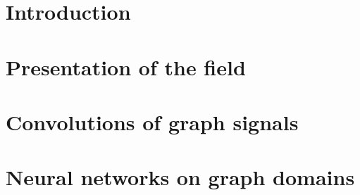 \documentclass[12pt]{book}
\begin{document}

%
%




\newline



 \dominitoc
 \tableofcontents
 \adjustmtc


%
%

\chapter*{Introduction}\label{chp:int}

\todo{}

%
%

  \chapter{Presentation of the field}\label{chap:1}
  \minitoc\newpage
  \newpage

  \newpage
  \newpage
  \newpage

%
%

\setcounter{chapter}{1}
\chapter{Convolutions of graph signals}\label{chap:2}
  \minitoc\newpage
  \newpage

\newpage
\newpage
\newpage
\newpage
\newpage

%
%
 \setcounter{chapter}{2}
 \chapter{Neural networks on graph domains}\label{chap:3}
  \minitoc\newpage
  \newpage
\end{document}
